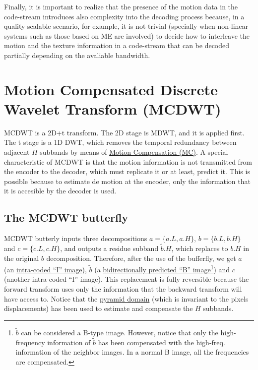 Finally, it is important to realize that the presence of the motion
data in the code-stream introduces also complexity into the decoding
process because, in a quality scalable scenario, for example, it is
not trivial (specially when non-linear systems such as those based on
ME are involved) to decide how to interleave the motion and the
texture information in a code-stream that can be decoded partially
depending on the avaliable bandwidth.


\section{Motion Compensated Discrete Wavelet Transform (MCDWT)}
MCDWT is a 2D+t transform. The 2D stage is MDWT, and it is applied
first. The t stage is a 1D DWT, which removes the temporal redundancy
between adjacent $H$ subbands by means of
\href{https://en.wikipedia.org/wiki/Motion_compensation}{Motion
  Compensation (MC)}. A special characteristic of MCDWT is that the
motion information is not transmitted from the encoder to the decoder,
which must replicate it or at least, predict it. This is possible
because to estimate de motion at the encoder, only the information
that it is accesible by the decoder is used.

\subsection{The MCDWT butterfly}
MCDWT butterly inputs three decompositions $a=\{a.L, a.H\}$, $b=\{b.L,
b.H\}$ and $c=\{c.L, c.H\}$, and outputs a residue subband
$\tilde{b}.H$, which replaces to $b.H$ in the original $b$
decomposition. Therefore, after the use of the bufferfly,
we get $a$ (an
\href{https://en.wikipedia.org/wiki/Video_compression_picture_types}{intra-coded
  ``I'' image}), $\tilde{b}$ (a
\href{https://en.wikipedia.org/wiki/Video_compression_picture_types}{bidirectionally
  predicted ``B'' image}\footnote{$\tilde{b}$ can be considered a
  B-type image. However, notice that only the high-frequency
  information of $\tilde{b}$ has been compensated with the
  high-freq. information of the neighbor images. In a normal B image,
  all the frequencies are compensated.}) and $c$ (another intra-coded
``I'' image). This replacement is fully reversible because the forward
transform uses only the information that the backward transform will
have access to. Notice that the
\href{http://www.vtvt.ece.vt.edu/research/references/video/DCT_Video_Compression/Zhang92a.pdf}{pyramid
  domain} (which is invariant to the pixels displacements) has been
used to estimate and compensate the $H$ subbands.

